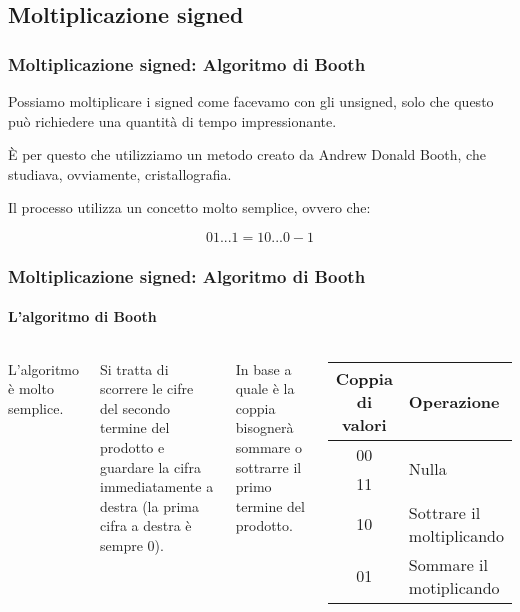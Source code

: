 \documentclass{beamer}
\begin{document}
	\subsection{Moltiplicazione signed}  
  \begin{frame}
    \frametitle{Moltiplicazione signed: Algoritmo di Booth}    	
		Possiamo moltiplicare i signed come facevamo con gli unsigned,
		solo che questo può richiedere una quantità di tempo impressionante.
		
		\vspace{2em}
		
		È per questo che utilizziamo un metodo creato da Andrew Donald Booth, che studiava,
		ovviamente, cristallografia.
		
		\vspace{2em}
		
		Il processo utilizza un concetto molto semplice, ovvero che:
		
		$$01\text{...}1 = 10\text{...}0 - 1$$
  \end{frame}
  \begin{frame}
    \frametitle{Moltiplicazione signed: Algoritmo di Booth}
    \framesubtitle{L'algoritmo di Booth}
    \begin{columns}
    	  L'algoritmo è molto semplice.
    	  
    	  Si tratta di scorrere le cifre del secondo termine del
    	  prodotto e guardare la cifra immediatamente a destra
    	  (la prima cifra a destra è sempre 0).
    	  
			\vspace{2em}    	  
    	  
    	  In base a quale è la coppia bisognerà sommare o sottrarre
    	  il primo termine del prodotto.
    		\begin{center}
			\begin{tabular}{|c||p{6em}|}
				\hline				
				Coppia di valori & Operazione \\
				\hline
				00 & \multirow{2}{*}{Nulla} \\
				11 & \\
				\hline				
				10 & Sottrare il moltiplicando 	\\
				\hline				
				01 & Sommare il motiplicando 		\\
				\hline 
			\end{tabular}
			\end{center}
    \end{columns}
  \end{frame}
\end{document}
